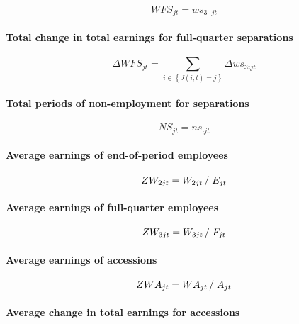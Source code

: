 \begin{equation}
WFS_{jt}=ws_{3\cdot jt}
\end{equation}

\paragraph{Total change in total earnings for full-quarter separations}

\begin{equation}
\Delta WFS_{jt} = \sum\limits_{i \in \left\{ {J(i,t) = j} \right\}} {\Delta
ws_{3ijt} }
\end{equation}

\paragraph{Total periods of non-employment for separations}

\begin{equation}
NS_{jt} = ns_{\cdot jt}
\end{equation}

\paragraph{Average earnings of end-of-period employees}

\begin{equation}
ZW_{2jt} = {W_{2jt} } \left/ {\vphantom {{W_{2jt} } {E_{jt} }}} \right. {%
E_{jt} }
\end{equation}

\paragraph{Average earnings of full-quarter employees}

\begin{equation}
ZW_{3jt} = {W_{3jt} } \left/ {\vphantom {{W_{3jt} } {F_{jt} }}} \right. {%
F_{jt} }
\end{equation}

\paragraph{Average earnings of accessions}

\begin{equation}
ZWA_{jt} = {WA_{jt} } \left/ {\vphantom {{WA_{jt} } {A_{jt} }}} \right. {%
A_{jt} }
\end{equation}

\paragraph{Average change in total earnings for accessions}

